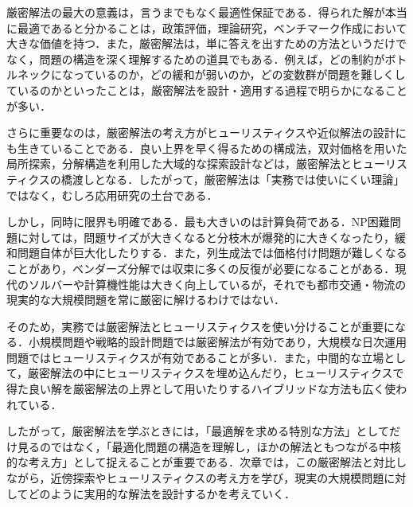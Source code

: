 厳密解法の最大の意義は，言うまでもなく最適性保証である．得られた解が本当に最適であると分かることは，政策評価，理論研究，ベンチマーク作成において大きな価値を持つ．また，厳密解法は，単に答えを出すための方法というだけでなく，問題の構造を深く理解するための道具でもある．例えば，どの制約がボトルネックになっているのか，どの緩和が弱いのか，どの変数群が問題を難しくしているのかといったことは，厳密解法を設計・適用する過程で明らかになることが多い．

さらに重要なのは，厳密解法の考え方がヒューリスティクスや近似解法の設計にも生きていることである．良い上界を早く得るための構成法，双対価格を用いた局所探索，分解構造を利用した大域的な探索設計などは，厳密解法とヒューリスティクスの橋渡しとなる．したがって，厳密解法は「実務では使いにくい理論」ではなく，むしろ応用研究の土台である．

しかし，同時に限界も明確である．最も大きいのは計算負荷である．NP困難問題に対しては，問題サイズが大きくなると分枝木が爆発的に大きくなったり，緩和問題自体が巨大化したりする．また，列生成法では価格付け問題が難しくなることがあり，ベンダーズ分解では収束に多くの反復が必要になることがある．現代のソルバーや計算機性能は大きく向上しているが，それでも都市交通・物流の現実的な大規模問題を常に厳密に解けるわけではない．

そのため，実務では厳密解法とヒューリスティクスを使い分けることが重要になる．小規模問題や戦略的設計問題では厳密解法が有効であり，大規模な日次運用問題ではヒューリスティクスが有効であることが多い．また，中間的な立場として，厳密解法の中にヒューリスティクスを埋め込んだり，ヒューリスティクスで得た良い解を厳密解法の上界として用いたりするハイブリッドな方法も広く使われている．

したがって，厳密解法を学ぶときには，「最適解を求める特別な方法」としてだけ見るのではなく，「最適化問題の構造を理解し，ほかの解法ともつながる中核的な考え方」として捉えることが重要である．次章では，この厳密解法と対比しながら，近傍探索やヒューリスティクスの考え方を学び，現実の大規模問題に対してどのように実用的な解法を設計するかを考えていく．


